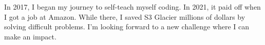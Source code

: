 

\begin{cvparagraph}

In 2017, I began my journey to self-teach myself coding. In 2021, it paid off when I got a job at Amazon. While there, I saved S3 Glacier millions of dollars by solving difficult problems. I'm looking forward to a new challenge where I can make an impact.
\end{cvparagraph}
